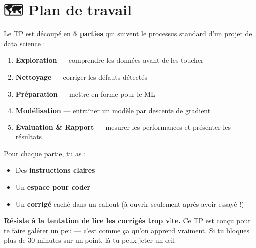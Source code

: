 \documentclass[
  french,
  11pt,
  a4paper,
]{scrbook}
\providecommand{\tightlist}{%
  \setlength{\itemsep}{0pt}\setlength{\parskip}{0pt}}
\begin{document}
\chapter{🗺️ Plan de travail}\label{plan-de-travail}

Le TP est découpé en \textbf{5 parties} qui suivent le processus
standard d'un projet de data science :

\begin{enumerate}
\def\labelenumi{\arabic{enumi}.}
\tightlist
\item
  \textbf{Exploration} --- comprendre les données avant de les toucher
\item
  \textbf{Nettoyage} --- corriger les défauts détectés
\item
  \textbf{Préparation} --- mettre en forme pour le ML
\item
  \textbf{Modélisation} --- entraîner un modèle par descente de gradient
\item
  \textbf{Évaluation \& Rapport} --- mesurer les performances et
  présenter les résultats
\end{enumerate}

Pour chaque partie, tu as :

\begin{itemize}
\tightlist
\item
  Des \textbf{instructions claires}
\item
  Un \textbf{espace pour coder}
\item
  Un \textbf{corrigé} caché dans un callout (à ouvrir seulement après
  avoir essayé !)
\end{itemize}

\begin{tcolorbox}[enhanced jigsaw, arc=.35mm, bottomrule=.15mm, bottomtitle=1mm, breakable, colback=white, colbacktitle=quarto-callout-tip-color!10!white, colframe=quarto-callout-tip-color-frame, coltitle=black, left=2mm, leftrule=.75mm, opacityback=0, opacitybacktitle=0.6, rightrule=.15mm, title=\textcolor{quarto-callout-tip-color}{\faLightbulb}\hspace{0.5em}{💡 Conseil pédagogique}, titlerule=0mm, toprule=.15mm, toptitle=1mm]

\textbf{Résiste à la tentation de lire les corrigés trop vite.} Ce TP
est conçu pour te faire galérer un peu --- c'est comme ça qu'on apprend
vraiment. Si tu bloques plus de 30 minutes sur un point, là tu peux
jeter un œil.

\end{tcolorbox}
\end{document}

